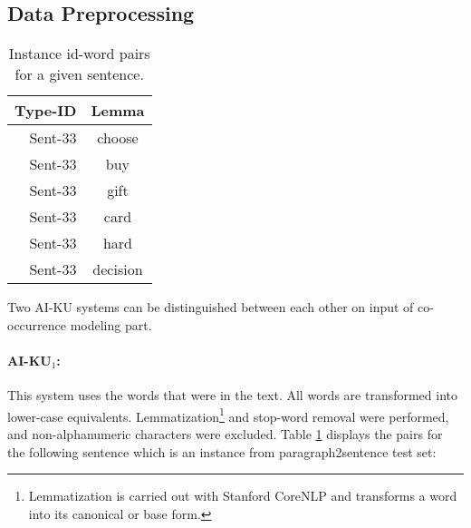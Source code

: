 \documentclass[11pt]{article}
\begin{document}
\subsection{Data Preprocessing}


\begin{table}
\begin{center}
\begin{tabular}{|r|c|}
\hline \bf Type-ID & \bf Lemma \\ \hline
Sent-33 & choose \\
Sent-33 & buy \\
Sent-33 & gift \\
Sent-33 & card \\
Sent-33 & hard \\
Sent-33 & decision \\
\hline
\end{tabular}
\end{center}
\caption{\label{tab:system1_input} Instance id-word pairs for a given sentence.}
\end{table}


\begin{table*}[htbp]
\caption{Contexts and substitute distributions when a bigram language model is used. $w$ and $n$ denote an arbitrary word in the vocabulary and the vocabulary size, respectively.}
\label{tab:subs_exp}
\end{table*}

Two AI-KU systems can be distinguished between each other on input of co-occurrence modeling part. 

\paragraph{AI-KU$_1$:} This system uses the words that were in the text. All words are transformed into lower-case equivalents. Lemmatization\footnote{Lemmatization is carried out with Stanford CoreNLP and transforms a word into its canonical or base form.} and stop-word removal were performed, and non-alphanumeric characters were excluded. 
Table \ref{tab:system1_input} displays the pairs for the following sentence which is an instance from paragraph2sentence test set:
\end{document}
